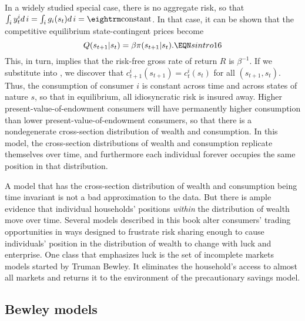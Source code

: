  In a widely studied special case, there is no aggregate risk, so
that $\int_{i}  y_t^i d \, i  = \int_i g_i(s_t) d \, i = {\rm constant}$.
In that case, it can be shown that the competitive equilibrium
state-contingent prices become
$$ Q(s_{t+1} | s_t) = \beta \pi(s_{t+1} | s_t) .  \EQN sintro16 $$
This, in turn, implies that the risk-free
gross rate of return $R$ is $\beta^{-1}$.
If we substitute  into , we discover that
$c^i_{t+1}(s_{t+1}) = c^i_t(s_t)$ for all $(s_{t+1}, s_t)$.
 Thus, the consumption
of consumer $i$ is constant across time and across states of nature
$s$, so that in equilibrium, all
idiosyncratic risk is insured away.
   Higher present-value-of-endowment consumers will have permanently higher
consumption than lower present-value-of-endowment consumers, so that there
is a nondegenerate cross-section distribution of wealth and consumption.
In this model, the cross-section distributions of wealth and consumption
replicate themselves over time, and furthermore each individual forever
occupies the same position in that distribution.

%
%
  A model that has the cross-section distribution  of wealth and consumption
being time invariant is not a bad approximation to the data.
But there is ample evidence that individual
households' positions {\it within\/} the distribution of wealth move over
 time. Several models
described in this book alter consumers' trading opportunities in
ways designed
 to frustrate risk sharing enough to cause individuals' position
in the  distribution of wealth to change with luck and enterprise.
One class that emphasizes luck is the set of incomplete markets
models started by  Truman Bewley. It eliminates the household's
access to almost all markets and returns it to the environment of
the precautionary savings model.

\subsection{Bewley models}

